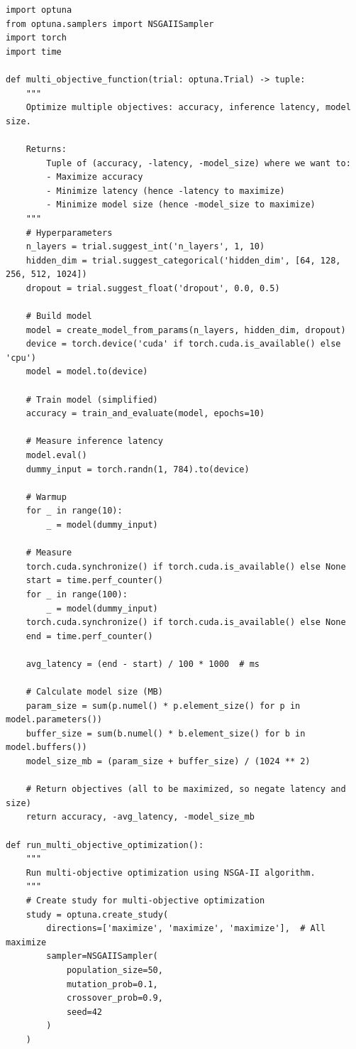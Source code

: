 \begin{lstlisting}[style=python, caption=Multi-objective optimization with Optuna]
import optuna
from optuna.samplers import NSGAIISampler
import torch
import time

def multi_objective_function(trial: optuna.Trial) -> tuple:
    """
    Optimize multiple objectives: accuracy, inference latency, model size.

    Returns:
        Tuple of (accuracy, -latency, -model_size) where we want to:
        - Maximize accuracy
        - Minimize latency (hence -latency to maximize)
        - Minimize model size (hence -model_size to maximize)
    """
    # Hyperparameters
    n_layers = trial.suggest_int('n_layers', 1, 10)
    hidden_dim = trial.suggest_categorical('hidden_dim', [64, 128, 256, 512, 1024])
    dropout = trial.suggest_float('dropout', 0.0, 0.5)

    # Build model
    model = create_model_from_params(n_layers, hidden_dim, dropout)
    device = torch.device('cuda' if torch.cuda.is_available() else 'cpu')
    model = model.to(device)

    # Train model (simplified)
    accuracy = train_and_evaluate(model, epochs=10)

    # Measure inference latency
    model.eval()
    dummy_input = torch.randn(1, 784).to(device)

    # Warmup
    for _ in range(10):
        _ = model(dummy_input)

    # Measure
    torch.cuda.synchronize() if torch.cuda.is_available() else None
    start = time.perf_counter()
    for _ in range(100):
        _ = model(dummy_input)
    torch.cuda.synchronize() if torch.cuda.is_available() else None
    end = time.perf_counter()

    avg_latency = (end - start) / 100 * 1000  # ms

    # Calculate model size (MB)
    param_size = sum(p.numel() * p.element_size() for p in model.parameters())
    buffer_size = sum(b.numel() * b.element_size() for b in model.buffers())
    model_size_mb = (param_size + buffer_size) / (1024 ** 2)

    # Return objectives (all to be maximized, so negate latency and size)
    return accuracy, -avg_latency, -model_size_mb

def run_multi_objective_optimization():
    """
    Run multi-objective optimization using NSGA-II algorithm.
    """
    # Create study for multi-objective optimization
    study = optuna.create_study(
        directions=['maximize', 'maximize', 'maximize'],  # All maximize
        sampler=NSGAIISampler(
            population_size=50,
            mutation_prob=0.1,
            crossover_prob=0.9,
            seed=42
        )
    )


\end{lstlisting}
